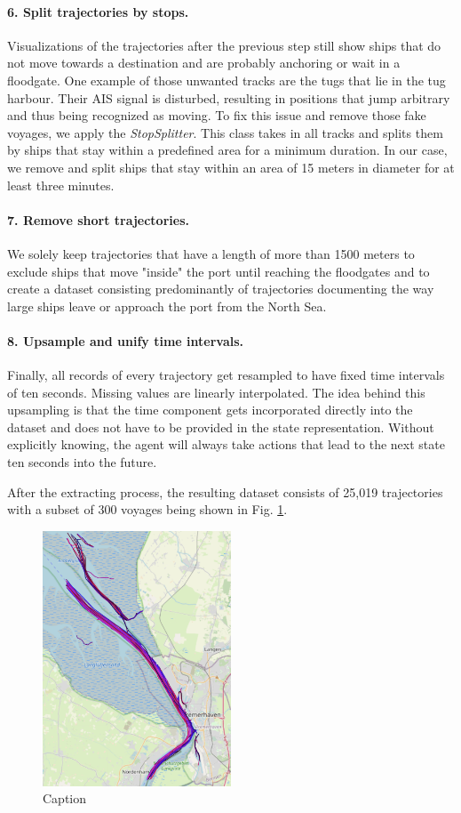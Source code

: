 \paragraph{6. Split trajectories by stops.}
Visualizations of the trajectories after the previous step still show ships that do not move towards a destination and are probably anchoring or wait in a floodgate. One example of those unwanted tracks are the tugs that lie in the tug harbour. Their AIS signal is disturbed, resulting in positions that jump arbitrary and thus being recognized as moving. To fix this issue and remove those fake voyages, we apply the \textit{StopSplitter}. This class takes in all tracks and splits them by ships that stay within a predefined area for a minimum duration. In our case, we remove and split ships that stay within an area of 15 meters in diameter for at least three minutes.


\paragraph{7. Remove short trajectories.}
We solely keep trajectories that have a length of more than 1500 meters to  exclude ships that move "inside" the port until reaching the floodgates and to create a dataset consisting predominantly of trajectories documenting the way large ships leave or approach the port from the North Sea.

\paragraph{8. Upsample and unify time intervals.}
Finally, all records of every trajectory get resampled to have fixed time intervals of ten seconds. Missing values are linearly interpolated. The idea behind this upsampling is that the time component gets incorporated directly into the dataset and does not have to be provided in the state representation. Without explicitly knowing, the agent will always take actions that lead to the next state ten seconds into the future.
\par

After the extracting process, the resulting dataset consists of 25,019 trajectories with a subset of 300 voyages being shown in Fig. \ref{fig:tracks}.

\begin{figure}[H]
    \centering
    \includegraphics[width=0.5\textwidth]{images/ais/tracks/all_ships.png}
    \caption{Caption}
    \label{fig:tracks}
\end{figure}